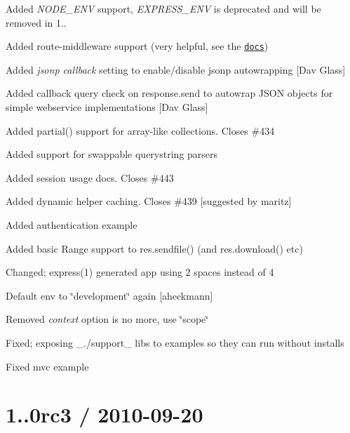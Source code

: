 {\ttfamily }

{\ttfamily 
\begin{DoxyItemize}
\item Added {\itshape N\+O\+D\+E\+\_\+\+E\+NV} support, {\itshape E\+X\+P\+R\+E\+S\+S\+\_\+\+E\+NV} is deprecated and will be removed in 1..
\item Added route-\/middleware support (very helpful, see the \href{http://expressjs.com/guide.html#Route-Middleware}{\tt docs})
\item Added {\itshape jsonp callback} setting to enable/disable jsonp autowrapping \mbox{[}Dav Glass\mbox{]}
\item Added callback query check on response.\+send to autowrap J\+S\+ON objects for simple webservice implementations \mbox{[}Dav Glass\mbox{]}
\item Added {\ttfamily partial()} support for array-\/like collections. Closes \#434
\item Added support for swappable querystring parsers
\item Added session usage docs. Closes \#443
\item Added dynamic helper caching. Closes \#439 \mbox{[}suggested by maritz\mbox{]}
\item Added authentication example
\item Added basic Range support to {\ttfamily res.\+sendfile()} (and {\ttfamily res.\+download()} etc)
\item Changed; {\ttfamily express(1)} generated app using 2 spaces instead of 4
\item Default env to \char`\"{}development\char`\"{} again \mbox{[}aheckmann\mbox{]}
\item Removed {\itshape context} option is no more, use \char`\"{}scope\char`\"{}
\item Fixed; exposing \+\_\+./support\+\_\+ libs to examples so they can run without installs
\item Fixed mvc example
\end{DoxyItemize}}

{\ttfamily \section*{1..\+0rc3 / 2010-\/09-\/20 }}

{\ttfamily }

